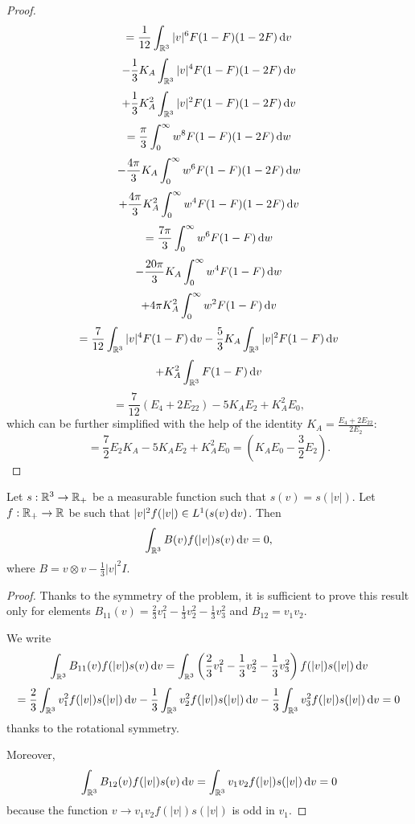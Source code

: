 \begin{subappendices}
\begin{proof}
\[=\frac {1}{12}\int_{\mathbb {R}^3} |v|^6 F(1-F)(1-2F){\,\mathrm{d} v} \]\[- \frac 13 K_A\int_{\mathbb {R}^3} |v|^4 F(1-F)(1-2F){\,\mathrm{d} v}\]\[+\frac 13K^2_A\int_{\mathbb {R}^3} |v|^2 F(1-F)(1-2F){\,\mathrm{d} v} \]
\[=\frac {\pi}{3}\int_0^\infty  w ^8 F(1-F)(1-2F){\,\mathrm{d} w} \]\[- \frac {4\pi}{3} K_A\int_0^\infty  w ^6 F(1-F)(1-2F){\,\mathrm{d} w}\]\[+\frac {4\pi}{3} K^2_A\int_0^\infty  w ^4 F(1-F)(1-2F){\,\mathrm{d} v} \]
\[=\frac {7\pi}{3}\int_0^\infty  w ^6 F(1-F){\,\mathrm{d} w} \]\[- \frac {20\pi}{3} K_A\int_0^\infty  w ^4 F(1-F) {\,\mathrm{d} w}\]\[+  {4\pi}  K^2_A\int_0^\infty  w ^2 F(1-F) {\,\mathrm{d} v} \]
\[=\frac {7}{12}\int_{\mathbb {R}^3} |v| ^4 F(1-F){\,\mathrm{d} v} - \frac {5}{3} K_A\int_{\mathbb {R}^3} |v| ^2 F(1-F) {\,\mathrm{d} v}\]\[+     K^2_A\int_{\mathbb {R}^3}  F(1-F) {\,\mathrm{d} v} \]
\[=\frac {7}{12}( E_4+2E_{22}) -  {5}  K_AE_2+     K^2_A E_0,\]
which can be further simplified with the help of the identity $K_A=\frac{E_4+2E_{22}}{2E_2}$:
\[=\frac {7}{2}E_2K_A -  {5}  K_AE_2+     K^2_A E_0 =\left(K_A E_0-\frac 32E_2\right). \]
\end{proof}
\begin{proposition} 
	Let $s:{\mathbb {R}^3}\to {\mathbb {R}}_+$ be a measurable function such that $s(v)=s(|v|)$. Let $f:{\mathbb {R}}_+\to {\mathbb {R}}$ be such that $|v|^2f(|v|)\in L^1(s(v){\,\mathrm{d} v})$. Then
	\[\int_{\mathbb {R}^3} B(v)f(|v|)s(v){\,\mathrm{d} v}=0,\]
	where $B=v\otimes v-\frac 13 |v|^2I$.
\end{proposition}
\begin{proof}
	Thanks to the symmetry of the problem, it is sufficient to prove this result only for elements $B_{11}(v) = \frac 23v_1^2-\frac 13 v_2^2-\frac 13 v_3^2$ and $B_{12}=v_1v_2$.

	We write
	\[\int_{\mathbb {R}^3} B_{11}(v)f(|v|)s(v){\,\mathrm{d} v}= \int_{\mathbb {R}^3}\left(\frac 23v_1^2-\frac 13 v_2^2-\frac 13 v_3^2\right)f(|v|)s(|v|){\,\mathrm{d} v}\]
	\[=\frac 23\int_{\mathbb {R}^3} v_1^2 f(|v|)s(|v|){\,\mathrm{d} v}-\frac 13\int_{\mathbb {R}^3}    v_2^2 f(|v|)s(|v|){\,\mathrm{d} v}-\frac 13\int_{\mathbb {R}^3}   v_3^2 f(|v|)s(|v|){\,\mathrm{d} v}=0\]
	thanks to the rotational symmetry. 

	Moreover,
	\[\int_{\mathbb {R}^3} B_{12}(v)f(|v|)s(v){\,\mathrm{d} v}=\int_{\mathbb {R}^3}  v_1v_2f(|v|)s(|v|){\,\mathrm{d} v}=0\]
	because the function $v\to v_1v_2f(|v|)s(|v|)$ is odd in $v_1$.
\end{proof}%
\end{subappendices}
